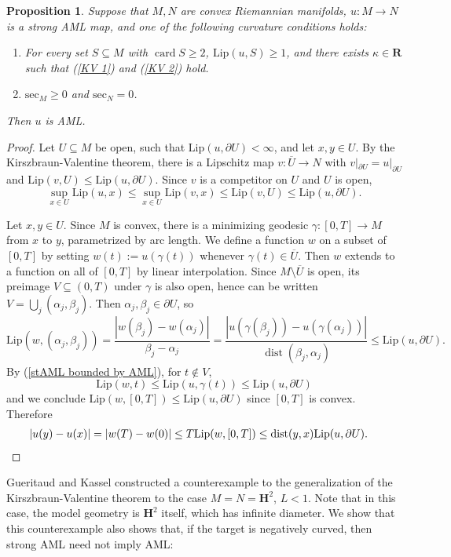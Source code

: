\documentclass[reqno,11pt]{amsart}
\newcommand{\RR}{\mathbf{R}}
\newcommand{\Hyp}{\mathbf H}
\DeclareMathOperator{\card}{card}
\DeclareMathOperator{\dist}{dist}
\newcommand{\Sec}{\mathrm{sec}}
\newcommand{\Lip}{\mathrm{Lip}}
\newtheorem{proposition}[theorem]{Proposition}
\theoremstyle{definition}
\numberwithin{equation}{section}
\begin{document}
\begin{proposition}
Suppose that $M, N$ are convex Riemannian manifolds, $u: M \to N$ is a strong AML map, and one of the following curvature conditions holds:
\begin{enumerate}
\item For every set $S \subseteq M$ with $\card S \geq 2$, $\Lip(u, S) \geq 1$, and there exists $\kappa \in \RR$ such that (\ref{KV 1}) and (\ref{KV 2}) hold.
\item $\Sec_M \geq 0$ and $\Sec_N = 0$.
\end{enumerate}
Then $u$ is AML.
\end{proposition}
\begin{proof}
Let $U \subseteq M$ be open, such that $\Lip(u, \partial U) < \infty$, and let $x, y \in U$.
By the Kirszbraun-Valentine theorem, there is a Lipschitz map $v: \overline U \to N$ with $v|_{\partial U} = u|_{\partial U}$ and $\Lip(v, U) \leq \Lip(u, \partial U)$.
Since $v$ is a competitor on $U$ and $U$ is open,
\begin{equation}\label{stAML bounded by AML}
\sup_{x \in U} \Lip(u, x) \leq \sup_{x \in U} \Lip(v, x) \leq \Lip(v, U) \leq \Lip(u, \partial U).
\end{equation}

Let $x, y \in U$.
Since $M$ is convex, there is a minimizing geodesic $\gamma: [0, T] \to M$ from $x$ to $y$, parametrized by arc length.
We define a function $w$ on a subset of $[0, T]$ by setting $w(t) := u(\gamma(t))$ whenever $\gamma(t) \in \overline U$.
Then $w$ extends to a function on all of $[0, T]$ by linear interpolation.
Since $M \setminus \overline U$ is open, its preimage $V \subseteq (0, T)$ under $\gamma$ is also open, hence can be written $V = \bigcup_j (\alpha_j, \beta_j)$.
Then $\alpha_j, \beta_j \in \partial U$, so
$$\Lip(w, (\alpha_j, \beta_j)) = \frac{|w(\beta_j) - w(\alpha_j)|}{\beta_j - \alpha_j} = \frac{|u(\gamma(\beta_j)) - u(\gamma(\alpha_j))|}{\dist(\beta_j, \alpha_j)} \leq \Lip(u, \partial U).$$
By (\ref{stAML bounded by AML}), for $t \notin V$,
$$\Lip(w, t) \leq \Lip(u, \gamma(t)) \leq \Lip(u, \partial U)$$
and we conclude $\Lip(w, [0, T]) \leq \Lip(u, \partial U)$ since $[0, T]$ is convex.
Therefore 
\begin{align*}
|u(y) - u(x)| &= |w(T) - w(0)| \leq T \Lip(w, [0, T]) \leq \dist(y, x) \Lip(u, \partial U). \qedhere 
\end{align*}
\end{proof}

Gueritaud and Kassel \cite[Example 9.6]{Gueritaud17} constructed a counterexample to the generalization of the Kirszbraun-Valentine theorem to the case $M = N = \Hyp^2$, $L < 1$.
Note that in this case, the model geometry is $\Hyp^2$ itself, which has infinite diameter.
We show that this counterexample also shows that, if the target is negatively curved, then strong AML need not imply AML:
\end{document}
